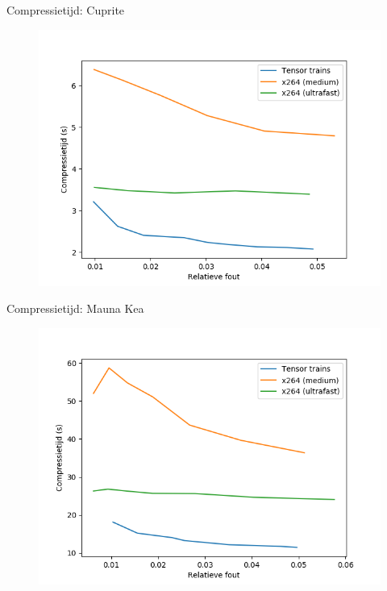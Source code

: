 \documentclass[t,12pt,dutch
\ifx\beamermode\undefined\else,\beamermode\fi
]{beamer}
\begin{document}
\begin{frame}{Compressietijd: Cuprite}

\begin{figure}[H]
\centering
\includegraphics[scale=0.5]{images/general_comparison_times_Cuprite.png}
\end{figure}

\end{frame}

\begin{frame}{Compressietijd: Mauna Kea}

\begin{figure}[H]
\centering
\includegraphics[scale=0.5]{images/general_comparison_times_Mauna_Kea.png}
\end{figure}

\end{frame}
\end{document}

